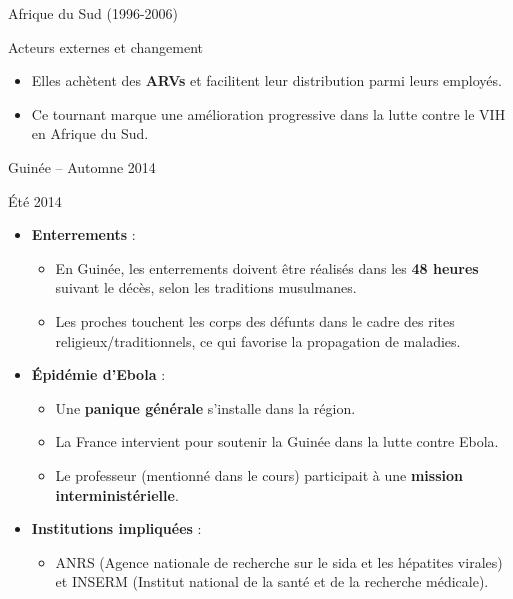 \documentclass[
  ignorenonframetext,
]{beamer}
\providecommand{\tightlist}{%
  \setlength{\itemsep}{0pt}\setlength{\parskip}{0pt}}\usepackage{longtable,booktabs,array}
\begin{document}
\begin{frame}{Afrique du Sud (1996-2006)}
\begin{block}{Acteurs externes et changement}
\begin{itemize}
\begin{itemize}
    \begin{itemize}
    \tightlist
    \item
      Elles achètent des \textbf{ARVs} et facilitent leur distribution
      parmi leurs employés.
    \item
      Ce tournant marque une amélioration progressive dans la lutte
      contre le VIH en Afrique du Sud.
    \end{itemize}
  \end{itemize}
\end{itemize}
\end{block}
\end{frame}

\begin{frame}{Guinée -- Automne 2014}
\protect\hypertarget{guinuxe9e-automne-2014}{}
\begin{block}{Été 2014}
\protect\hypertarget{uxe9tuxe9-2014}{}
\begin{itemize}
\tightlist
\item
  \textbf{Enterrements} :

  \begin{itemize}
  \tightlist
  \item
    En Guinée, les enterrements doivent être réalisés dans les
    \textbf{48 heures} suivant le décès, selon les traditions
    musulmanes.
  \item
    Les proches touchent les corps des défunts dans le cadre des rites
    religieux/traditionnels, ce qui favorise la propagation de maladies.
  \end{itemize}
\item
  \textbf{Épidémie d'Ebola} :

  \begin{itemize}
  \tightlist
  \item
    Une \textbf{panique générale} s'installe dans la région.
  \item
    La France intervient pour soutenir la Guinée dans la lutte contre
    Ebola.
  \item
    Le professeur (mentionné dans le cours) participait à une
    \textbf{mission interministérielle}.
  \end{itemize}
\item
  \textbf{Institutions impliquées} :

  \begin{itemize}
  \tightlist
  \item
    ANRS (Agence nationale de recherche sur le sida et les hépatites
    virales) et INSERM (Institut national de la santé et de la recherche
    médicale).
  \end{itemize}
\end{itemize}
\end{block}
\end{frame}
\end{document}
